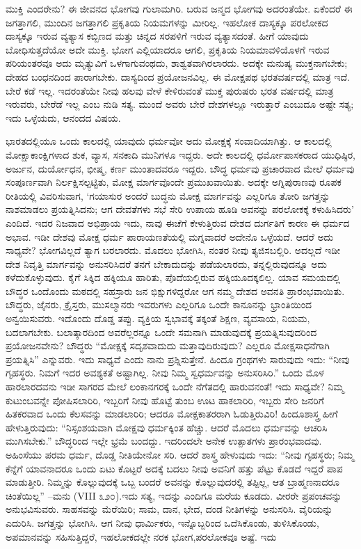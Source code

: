 ಮುಕ್ತಿ ಎಂದರೇನು? ಈ ಜೀವನದ ಭೋಗವು ಗುಲಾಮಗಿರಿ. ಬರುವ ಜನ್ಮದ ಭೋಗವು ಅದರಂತೆಯೇ. ಏಕೆಂದರೆ ಈ ಜಗತ್ತಾಗಲಿ, ಮುಂದಿನ ಜಗತ್ತಾಗಲಿ ಪ್ರಕೃತಿಯ ನಿಯಮಗಳನ್ನು ಮೀರಿಲ್ಲ. ಇಹಲೋಕ ದಾಸ್ಯಕ್ಕೂ ಪರಲೋಕದ ದಾಸ್ಯಕ್ಕೂ ಇರುವ ವ್ಯತ್ಯಾಸ ಕಬ್ಬಿಣದ ಮತ್ತು ಚಿನ್ನದ ಸರಪಳಿಗೆ ಇರುವ ವ್ಯತ್ಯಾಸದಂತೆ. ಹೀಗೆ ಯಾವುದು ಬೋಧಿಸುತ್ತದೆಯೋ ಅದೇ ಮುಕ್ತಿ. ಭೋಗ ಎಲ್ಲಿಯಾದರೂ ಆಗಲಿ, ಪ್ರಕೃತಿಯ ನಿಯಮಾ\break ವಳಿಯೊಳಗೆ ಇರುವ ಪರಿಯಂತರವೂ ಅದು ಮೃತ್ಯುವಿಗೆ ಒಳಗಾಗುವಂಥದು, ಶಾಶ್ವತ\break ವಾಗಿರಲಾರದು. ಅದಕ್ಕೇ ಮನುಷ್ಯ ಮುಕ್ತನಾಗಬೇಕು; ದೇಹದ ಬಂಧನದಿಂದ ಪಾರಾಗಬೇಕು. ದಾಸ್ಯದಿಂದ ಪ್ರಯೋಜನವಿಲ್ಲ. ಈ ಮೋಕ್ಷಪಥ ಭರತವರ್ಷದಲ್ಲಿ ಮಾತ್ರ ಇದೆ. ಬೇರೆ ಕಡೆ ಇಲ್ಲ. ಇದರಂತೆಯೇ ನೀವು ಹಲವು ವೇಳೆ ಕೇಳಿರುವಂತೆ ಮುಕ್ತ ಪುರುಷರು ಭರತ ವರ್ಷದಲ್ಲಿ ಮಾತ್ರ ಇರುವರು, ಬೇರೆಡೆ ಇಲ್ಲ ಎಂಬ ನುಡಿ ಸತ್ಯ. ಮುಂದೆ ಅವರು ಬೇರೆ ದೇಶಗಳಲ್ಲೂ ಇರುತ್ತಾರೆ ಎಂಬುದೂ ಅಷ್ಟೇ ಸತ್ಯ; ಇದು ಒಳ್ಳೆಯದು, ಆನಂದದ ವಿಷಯ.

ಭಾರತದಲ್ಲಿಯೂ ಒಂದು ಕಾಲದಲ್ಲಿ ಯಾವುದು ಧರ್ಮವೋ ಅದು ಮೋಕ್ಷಕ್ಕೆ ಸಂವಾದಿಯಾಗಿತ್ತು. ಆ ಕಾಲದಲ್ಲಿ ಮೋಕ್ಷಾಕಾಂಕ್ಷಿಗಳಾದ ಶುಕ, ವ್ಯಾಸ, ಸನಕಾದಿ ಮುನಿ\-ಗಳೂ ಇದ್ದರು. ಅದೇ ಕಾಲದಲ್ಲಿ ಧರ್ಮೋಪಾಸಕರಾದ ಯುಧಿಷ್ಠಿರ, ಅರ್ಜುನ, ದುರ್ಯೋ\break ಧನ, ಭೀಷ್ಮ, ಕರ್ಣ ಮುಂತಾದವರೂ ಇದ್ದರು. ಬೌದ್ಧ ಧರ್ಮವು ಪ್ರಚಾರವಾದ ಮೇಲೆ ಧರ್ಮವು ಸಂಪೂರ್ಣವಾಗಿ ನಿರ್ಲಕ್ಷಿಸಲ್ಪಟ್ಟಿತು, ಮೋಕ್ಷ ಮಾರ್ಗವೊಂದೇ ಪ್ರಮುಖ\break ವಾಯಿತು. ಅದಕ್ಕೇ ಅಗ್ನಿಪುರಾಣವು ರೂಪಕ ರೀತಿಯಲ್ಲಿ ವಿವರಿಸುವಾಗ, ‘ಗಯಾಸುರ ಅಂದರೆ ಬುದ್ಧನು ಮೋಕ್ಷ ಮಾರ್ಗವನ್ನು ಎಲ್ಲರಿಗೂ ತೋರಿ ಜಗತ್ತನ್ನು ನಾಶಮಾಡಲು ಪ್ರಯತ್ನಿಸಿದನು; ಆಗ ದೇವತೆಗಳು ಸಭೆ ಸೇರಿ ಉಪಾಯ ಹೂಡಿ ಅವನನ್ನು ಪರಲೋಕಕ್ಕೆ ಕಳುಹಿಸಿದರು’ ಎಂದಿದೆ. ಇದರ ನಿಜವಾದ ಅಭಿಪ್ರಾಯ ಇದು, ನಾವು ಈಚೆಗೆ ಕೇಳುತ್ತಿರುವ ದೇಶದ ದುರ್ಗತಿಗೆ ಕಾರಣ ಈ ಧರ್ಮದ ಅಭಾವ. ಇಡೀ ದೇಶವು ಮೋಕ್ಷ ಧರ್ಮ ಪಾರಾಯಣತೆಯಲ್ಲಿ ಮಗ್ನವಾದರೆ ಅದೇನೊ ಒಳ್ಳೆಯದೆ. ಆದರೆ ಅದು ಸಾಧ್ಯವೇ? ಭೋಗವಿಲ್ಲದೆ ತ್ಯಾಗ ಬರಲಾರದು. ಮೊದಲು ಭೋಗಿಸಿ, ನಂತರ ನೀವು ತ್ಯಜಿಸಬಲ್ಲಿರಿ. ಅದಲ್ಲದೆ ಇಡೀ ದೇಶ ನಿವೃತ್ತಿ ಮಾರ್ಗವನ್ನು ಅನುಸರಿಸಿದರೆ ತನಗೆ ಬೇಕಾದುದನ್ನು ಪಡೆಯಲಾರದು, ತನ್ನಲ್ಲಿರುವುದನ್ನೂ ಅದು ಕಳೆದುಕೊಳ್ಳುವುದು. ಕೈಗೆ ಸಿಕ್ಕಿದ ಹಕ್ಕಿಯೂ ಹಾರಿತು, ಪೊದೆಯಲ್ಲಿರುವ ಹಕ್ಕಿಯೂದಕ್ಕಲಿಲ್ಲ. ಯಾವ ಸಮಯದಲ್ಲಿ ಬೌದ್ಧರ ಒಂದೊಂದು ಮಠದಲ್ಲಿ ಸಹಸ್ರಾರು ಜನ ಭಿಕ್ಷುಗಳಿದ್ದರೋ ಆಗ ನಮ್ಮ ದೇಶದ ಅವನತಿ ಪ್ರಾರಂಭವಾಯಿತು. ಬೌದ್ಧರು, ಜೈನರು, ಕ್ರೈಸ್ತರು, ಮುಸಲ್ಮಾನರು ಇವರುಗಳು ಎಲ್ಲರಿಗೂ ಒಂದೇ ಕಾನೂನನ್ನು ಭ್ರಾಂತಿಯಿಂದ ಅನ್ವಯಿಸುವರು. ಇದೊಂದು ದೊಡ್ಡ ತಪ್ಪು. ವ್ಯಕ್ತಿಯ ಸ್ವಭಾವಕ್ಕೆ ತಕ್ಕಂತೆ ಶಿಕ್ಷಣ, ವ್ಯವಸಾಯ, ನಿಯಮ, ಬದಲಾಗಬೇಕು. ಬಲಾತ್ಕಾರದಿಂದ ಅವರೆಲ್ಲರನ್ನೂ ಒಂದೇ ಸಮನಾಗಿ ಮಾಡುವುದಕ್ಕೆ ಪ್ರಯತ್ನಿಸುವುದರಿಂದ ಪ್ರಯೋಜನವೇನು? ಬೌದ್ಧರು “ಮೋಕ್ಷಕ್ಕೆ ಸದೃಶವಾದುದು ಮತ್ತಾವುದಿರುವುದು? ಎಲ್ಲರೂ ಮೋಕ್ಷ\break ಸಾಧನೆಗಾಗಿ ಪ್ರಯತ್ನಿಸಿ” ಎನ್ನುವರು. ಇದು ಸಾಧ್ಯವೆ ಎಂದು ನಾನು ಪ್ರಶ್ನಿಸುತ್ತೇನೆ. ಹಿಂದೂ ಗ್ರಂಥಗಳು ಸಾರುವುದು ಇದು: “ನೀವು ಗೃಹಸ್ಥರು. ನಿಮಗೆ ಇದರ ಅವಶ್ಯಕತೆ ಅಷ್ಟಾಗಿಲ್ಲ. ನೀವು ನಿಮ್ಮ ಸ್ವಧರ್ಮವನ್ನು ಅನುಸರಿಸಿರಿ.” ಒಂದು ಮೊಳ ಹಾರಲಾರದವನು ಇಡೀ ಸಾಗರದ ಮೇಲೆ ಲಂಕಾನಗರಕ್ಕೆ ಒಂದೇ ನೆಗೆತದಲ್ಲಿ ಹಾರುವನಂತೆ! ಇದು ಸಾಧ್ಯವೇ? ನಿಮ್ಮ ಕುಟುಂಬವನ್ನೇ ಪೋಷಿಸಲಾರಿರಿ, ಇಬ್ಬರಿಗೆ ನೀವು ಹೊಟ್ಟೆ ತುಂಬ ಊಟ ಹಾಕಲಾರಿರಿ, ಇಬ್ಬರು ಸೇರಿ ಜನರಿಗೆ ಹಿತಕರವಾದ ಒಂದು ಕೆಲಸವನ್ನು ಮಾಡಲಾರಿರಿ; ಆದರೂ ಮೋಕ್ಷಕಾತರರಾಗಿ ಓಡುತ್ತಿರುವಿರಿ! ಹಿಂದೂಶಾಸ್ತ್ರ ಹೀಗೆ ಹೇಳುತ್ತಿರುವುದು: “ನಿಸ್ಸಂಶಯವಾಗಿ ಮೋಕ್ಷವು ಧರ್ಮಕ್ಕಿಂತ ಹೆಚ್ಚು. ಆದರೆ ಮೊದಲು ಧರ್ಮವನ್ನು ಆಚರಿಸಿ ಮುಗಿಸಬೇಕು.” ಬೌದ್ಧರಿಂದ ಇಲ್ಲೇ ಭ್ರಮೆ ಬಂದದ್ದು. ಇದರಿಂದಲೇ ಅನೇಕ ಉತ್ಪಾತಗಳು ಪ್ರಾರಂಭವಾದವು. ಅಹಿಂಸೆಯು ಪರಮ ಧರ್ಮ, ದೊಡ್ಡ ನೀತಿಯೇನೋ ಸರಿ. ಆದರೆ ಶಾಸ್ತ್ರ ಹೇಳುವುದು ಇದು: “ನೀವು ಗೃಹಸ್ಥರು; ನಿಮ್ಮ ಕೆನ್ನೆಗೆ ಯಾವನಾದರೂ ಒಂದು ಏಟು ಕೊಟ್ಟರೆ ಅದಕ್ಕೆ ಬದಲು ನೀವು ಅವನಿಗೆ ಹತ್ತು ಪೆಟ್ಟು ಕೊಡದೆ ಇದ್ದರೆ ಪಾಪ ಮಾಡುತ್ತೀರಿ. ನಿಮ್ಮನ್ನು ಕೊಲ್ಲುವುದಕ್ಕೆ ಒಬ್ಬ ಬಂದರೆ ಅವನನ್ನು ಕೊಲ್ಲುವುದರಲ್ಲಿ ತಪ್ಪಿಲ್ಲ, ಆತ ಬ್ರಾಹ್ಮಣನಾದರೂ ಚಿಂತೆಯಿಲ್ಲ” –ಮನು (VIII ೩೨೦).ಇದು ಸತ್ಯ, ಇದನ್ನು ಎಂದಿಗೂ ಮರೆಯ ಕೂಡದು. ವೀರರೇ ಪ್ರಪಂಚವನ್ನು ಅನುಭವಿಸುವರು. ಸಾಹಸವನ್ನು ಮೆರೆಯಿರಿ; ಸಾಮ, ದಾನ, ಭೇದ, ದಂಡ ನೀತಿಗಳನ್ನು ಅನುಸರಿಸಿ. ವೈರಿಯನ್ನು ಎದುರಿಸಿ. ಜಗತ್ತನ್ನು ಭೋಗಿಸಿ. ಆಗ ನೀವು ಧಾರ್ಮಿಕರು, ಇನ್ನೊಬ್ಬರಿಂದ ಒದೆಸಿಕೊಂಡು, ತುಳಿಸಿಕೊಂಡು, ಅಪಮಾನವನ್ನು ಸಹಿಸುತ್ತಿದ್ದರೆ, ಇಹಲೋಕದಲ್ಲೇ ನರಕ ಭೋಗ,\break ಪರಲೋಕವೂ ಅಷ್ಟೆ. ಇದು 